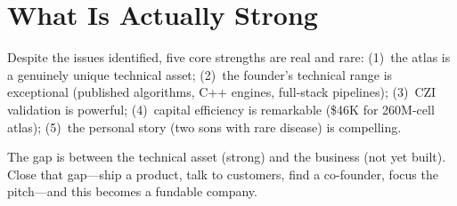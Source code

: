 \documentclass[10pt,twocolumn,letterpaper]{article}
\begin{document}
\section{What Is Actually Strong}
\label{sec:strengths}

Despite the issues identified, five core strengths are real and rare:
(1)~the atlas is a genuinely unique technical asset;
(2)~the founder's technical range is exceptional (published algorithms, C++
engines, full-stack pipelines);
(3)~CZI validation is powerful;
(4)~capital efficiency is remarkable (\$46K for 260M-cell atlas);
(5)~the personal story (two sons with rare disease) is compelling.

The gap is between the technical asset (strong) and the business (not yet built).
Close that gap---ship a product, talk to customers, find a co-founder, focus the
pitch---and this becomes a fundable company.



\end{document}
